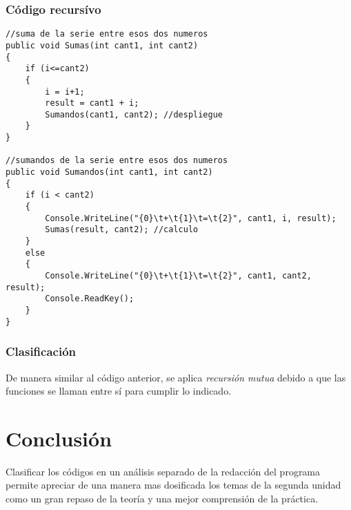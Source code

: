 \documentclass[letterpaper, 12pt]{article}
\begin{document}
\begin{justify}
            \subsubsection{Código recursívo}
\begin{verbatim}
//suma de la serie entre esos dos numeros
public void Sumas(int cant1, int cant2)
{
    if (i<=cant2)
    {
        i = i+1;
        result = cant1 + i;
        Sumandos(cant1, cant2); //despliegue
    }
}
    
//sumandos de la serie entre esos dos numeros
public void Sumandos(int cant1, int cant2)
{
    if (i < cant2)
    {
        Console.WriteLine("{0}\t+\t{1}\t=\t{2}", cant1, i, result);
        Sumas(result, cant2); //calculo
    }
    else
    {
        Console.WriteLine("{0}\t+\t{1}\t=\t{2}", cant1, cant2, result);
        Console.ReadKey();
    }
}   
\end{verbatim}
            \subsubsection{Clasificación}
            De manera similar al código anterior, se aplica \emph{recursión mutua} debido a que las funciones se llaman entre sí para cumplir lo indicado.
        \section{Conclusión}
        Clasificar los códigos en un análisis separado de la redacción del programa permite apreciar de una manera mas dosificada los temas de la segunda unidad como un gran repaso de la teoría
        y una mejor comprensión de la práctica.
    \end{justify}
\end{document}
